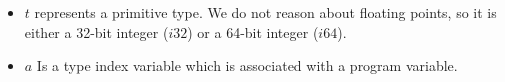 \begin{itemize}
    \item $t$ represents a primitive \wasm type.
    We do not reason about floating points, so it is either a 32-bit integer ($i32$) or a 64-bit integer ($i64$).
    \item $a$ Is a type index variable which is associated with a program variable.
\end{itemize}

